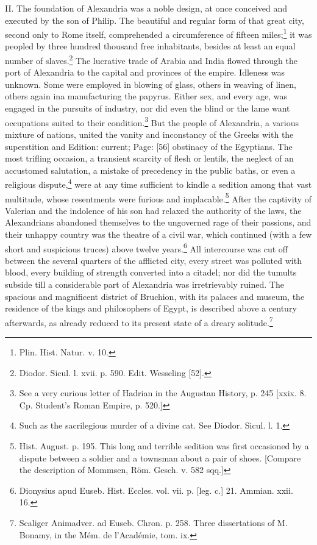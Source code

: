II. The foundation of Alexandria was a noble design, at once conceived and executed by the son of Philip. The beautiful and regular form of that great city, second only to Rome itself, comprehended a circumference of fifteen miles;\footnote{Plin. Hist. Natur. v. 10.} it was peopled by three hundred thousand free inhabitants, besides at least an equal number of slaves.\footnote{Diodor. Sicul. l. xvii. p. 590. Edit. Wesseling [52].} The lucrative trade of Arabia and India flowed through the port of Alexandria to the capital and provinces of the empire. Idleness was unknown. Some were employed in blowing of glass, others in weaving of linen, others again ina manufacturing the papyrus. Either sex, and every age, was engaged in the pursuits of industry, nor did even the blind or the lame want occupations suited to their condition.\footnote{See a very curious letter of Hadrian in the Augustan History, p. 245 [xxix. 8. Cp. Student\texthebrew{}’s Roman Empire, p. 520.]} But the people of Alexandria, a various mixture of nations, united the vanity and inconstancy of the Greeks with the superstition and Edition: current; Page: [56] obstinacy of the Egyptians. The most trifling occasion, a transient scarcity of flesh or lentils, the neglect of an accustomed salutation, a mistake of precedency in the public baths, or even a religious dispute,\footnote{Such as the sacrilegious murder of a divine cat. See Diodor. Sicul. l. 1.} were at any time sufficient to kindle a sedition among that vast multitude, whose resentments were furious and implacable.\footnote{Hist. August. p. 195. This long and terrible sedition was first occasioned by a dispute between a soldier and a townsman about a pair of shoes. [Compare the description of Mommsen, Röm. Gesch. v. 582 sqq.]} After the captivity of Valerian and the indolence of his son had relaxed the authority of the laws, the Alexandrians abandoned themselves to the ungoverned rage of their passions, and their unhappy country was the theatre of a civil war, which continued (with a few short and suspicious truces) above twelve years.\footnote{Dionysius apud Euseb. Hist. Eccles. vol. vii. p. [leg. c.] 21. Ammian. xxii. 16.} All intercourse was cut off between the several quarters of the afflicted city, every street was polluted with blood, every building of strength converted into a citadel; nor did the tumults subside till a considerable part of Alexandria was irretrievably ruined. The spacious and magnificent district of Bruchion, with its palaces and museum, the residence of the kings and philosophers of Egypt, is described above a century afterwards, as already reduced to its present state of a dreary solitude.\footnote{Scaliger Animadver. ad Euseb. Chron. p. 258. Three dissertations of M. Bonamy, in the Mém. de l\texthebrew{}’Académie, tom. ix.}

